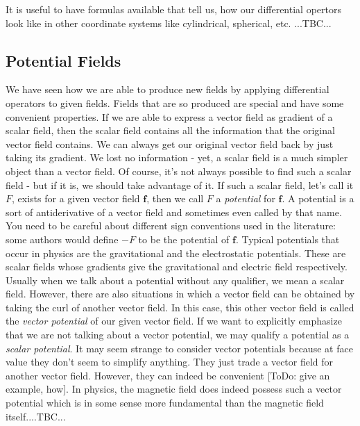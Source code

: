 It is useful to have formulas available that tell us, how our differential opertors look like in other coordinate systems like cylindrical, spherical, etc.
...TBC...





\subsection{Potential Fields}
We have seen how we are able to produce new fields by applying differential operators to given fields. Fields that are so produced are special and have some convenient properties. If we are able to express a vector field as gradient of a scalar field, then the scalar field contains all the information that the original vector field contains. We can always get our original vector field back by just taking its gradient. We lost no information - yet, a scalar field is a much simpler object than a vector field. Of course, it's not always possible to find such a scalar field - but if it is, we should take advantage of it. If such a scalar field, let's call it $F$, exists for a given vector field $\mathbf{f}$, then we call $F$ a \emph{potential} for $\mathbf{f}$. A potential is a sort of antiderivative of a vector field and sometimes even called by that name. You need to be careful about different sign conventions used in the literature: some authors would define $-F$ to be the potential of $\mathbf{f}$. Typical potentials that occur in physics are the gravitational and the electrostatic potentials. These are scalar fields whose gradients give the gravitational and electric field respectively. Usually when we talk about a potential without any qualifier, we mean a scalar field. However, there are also situations in which a vector field can be obtained by taking the curl of another vector field. In this case, this other vector field is called the \emph{vector potential} of our given vector field. If we want to explicitly emphasize that we are not talking about a vector potential, we may qualify a potential as a \emph{scalar potential}. It may seem strange to consider vector potentials because at face value they don't seem to simplify anything. They just trade a vector field for another vector field. However, they can indeed be convenient [ToDo: give an example, how]. In physics, the magnetic field does indeed possess such a vector potential which is in some sense more fundamental than the magnetic field itself....TBC...

